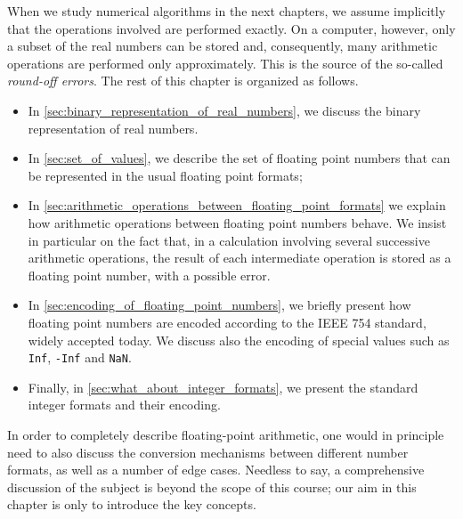When we study numerical algorithms in the next chapters,
we assume implicitly that the operations involved are performed exactly.
On a computer, however, only a subset of the real numbers can be stored and,
consequently, many arithmetic operations are performed only approximately.
This is the source of the so-called \emph{round-off errors}.
The rest of this chapter is organized as follows.
\begin{itemize}
    \item
        In \cref{sec:binary_representation_of_real_numbers},
        we discuss the binary representation of real numbers.

    \item
        In \cref{sec:set_of_values},
        we describe the set of floating point numbers that can be represented in the usual floating point formats;

    \item
        In \cref{sec:arithmetic_operations_between_floating_point_formats}
        we explain how arithmetic operations between floating point numbers behave.
        We insist in particular on the fact that,
        in a calculation involving several successive arithmetic operations,
        the result of each intermediate operation is stored as a floating point number,
        with a possible error.

    \item
        In \cref{sec:encoding_of_floating_point_numbers},
        we briefly present how floating point numbers are encoded
        according to the IEEE 754 standard, widely accepted today.
        We discuss also the encoding of special values such as \texttt{Inf}, \texttt{-Inf} and \texttt{NaN}.

    \item
        Finally, in \cref{sec:what_about_integer_formats},
        we present the standard integer formats and their encoding.
\end{itemize}
In order to completely describe floating-point arithmetic,
one would in principle need to also discuss the conversion mechanisms between different number formats,
as well as a number of edge cases.
Needless to say,
a comprehensive discussion of the subject is beyond the scope of this course;
our aim in this chapter is only to introduce the key concepts.

